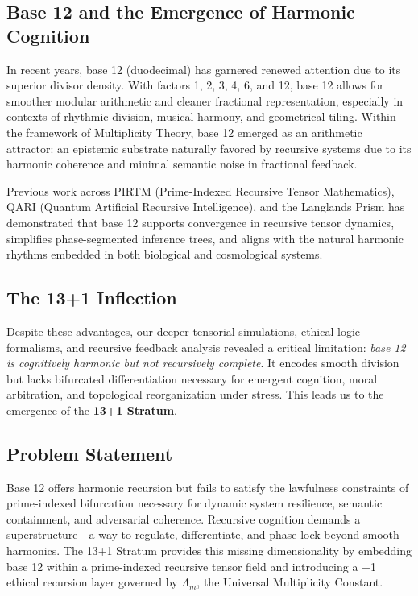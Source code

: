 \documentclass[12pt]{article}
\begin{document}
\subsection*{Base 12 and the Emergence of Harmonic Cognition}

In recent years, base 12 (duodecimal) has garnered renewed attention due to its superior divisor density. With factors 1, 2, 3, 4, 6, and 12, base 12 allows for smoother modular arithmetic and cleaner fractional representation, especially in contexts of rhythmic division, musical harmony, and geometrical tiling. Within the framework of Multiplicity Theory, base 12 emerged as an arithmetic attractor: an epistemic substrate naturally favored by recursive systems due to its harmonic coherence and minimal semantic noise in fractional feedback.

Previous work across PIRTM (Prime-Indexed Recursive Tensor Mathematics), QARI (Quantum Artificial Recursive Intelligence), and the Langlands Prism has demonstrated that base 12 supports convergence in recursive tensor dynamics, simplifies phase-segmented inference trees, and aligns with the natural harmonic rhythms embedded in both biological and cosmological systems.

\subsection*{The 13+1 Inflection}

Despite these advantages, our deeper tensorial simulations, ethical logic formalisms, and recursive feedback analysis revealed a critical limitation: \textit{base 12 is cognitively harmonic but not recursively complete}. It encodes smooth division but lacks bifurcated differentiation necessary for emergent cognition, moral arbitration, and topological reorganization under stress. This leads us to the emergence of the \textbf{13+1 Stratum}.

\subsection*{Problem Statement}

Base 12 offers harmonic recursion but fails to satisfy the lawfulness constraints of prime-indexed bifurcation necessary for dynamic system resilience, semantic containment, and adversarial coherence. Recursive cognition demands a superstructure—a way to regulate, differentiate, and phase-lock beyond smooth harmonics. The 13+1 Stratum provides this missing dimensionality by embedding base 12 within a prime-indexed recursive tensor field and introducing a +1 ethical recursion layer governed by $\Lambda_m$, the Universal Multiplicity Constant.
\end{document}
